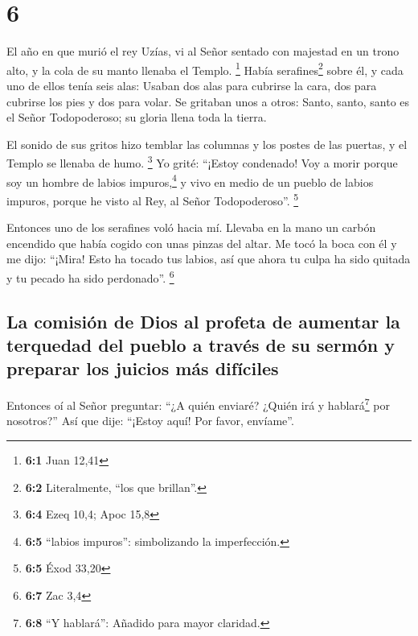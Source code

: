 \hypertarget{section-5}{%
\section{6}\label{section-5}}

 El año en que murió el rey Uzías, vi al Señor sentado con
majestad en un trono alto, y la cola de su manto llenaba el Templo.
\footnote{\textbf{6:1} Juan 12,41}  Había
serafines\footnote{\textbf{6:2} Literalmente, ``los que brillan''.}
sobre él, y cada uno de ellos tenía seis alas: Usaban dos alas para
cubrirse la cara, dos para cubrirse los pies y dos para volar.
 Se gritaban unos a otros: Santo, santo, santo es el Señor
Todopoderoso; su gloria llena toda la tierra.

 El sonido de sus gritos hizo temblar las columnas y los
postes de las puertas, y el Templo se llenaba de humo. \footnote{\textbf{6:4}
  Ezeq 10,4; Apoc 15,8}  Yo grité: ``¡Estoy condenado! Voy
a morir porque soy un hombre de labios impuros,\footnote{\textbf{6:5}
  ``labios impuros'': simbolizando la imperfección.} y vivo en medio de
un pueblo de labios impuros, porque he visto al Rey, al Señor
Todopoderoso''. \footnote{\textbf{6:5} Éxod 33,20}

 Entonces uno de los serafines voló hacia mí. Llevaba en
la mano un carbón encendido que había cogido con unas pinzas del altar.
 Me tocó la boca con él y me dijo: ``¡Mira! Esto ha tocado
tus labios, así que ahora tu culpa ha sido quitada y tu pecado ha sido
perdonado''. \footnote{\textbf{6:7} Zac 3,4}

\hypertarget{la-comisiuxf3n-de-dios-al-profeta-de-aumentar-la-terquedad-del-pueblo-a-travuxe9s-de-su-sermuxf3n-y-preparar-los-juicios-muxe1s-difuxedciles}{%
\subsection{La comisión de Dios al profeta de aumentar la terquedad del
pueblo a través de su sermón y preparar los juicios más
difíciles}\label{la-comisiuxf3n-de-dios-al-profeta-de-aumentar-la-terquedad-del-pueblo-a-travuxe9s-de-su-sermuxf3n-y-preparar-los-juicios-muxe1s-difuxedciles}}

 Entonces oí al Señor preguntar: ``¿A quién enviaré?
¿Quién irá y hablará\footnote{\textbf{6:8} ``Y hablará'': Añadido para
  mayor claridad.} por nosotros?'' Así que dije: ``¡Estoy aquí! Por
favor, envíame''.

